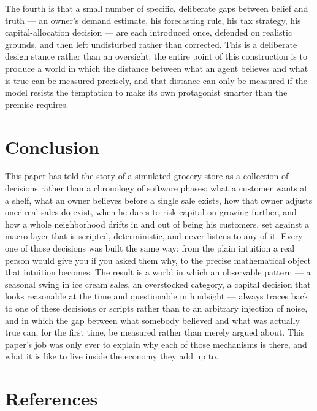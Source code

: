 \documentclass[12pt,a4paper]{article}
\begin{document}
The fourth is that a small number of specific, deliberate gaps between
belief and truth --- an owner's demand estimate, his forecasting rule,
his tax strategy, his capital-allocation decision --- are each
introduced once, defended on realistic grounds, and then left
undisturbed rather than corrected. This is a deliberate design stance
rather than an oversight: the entire point of this construction is to
produce a world in which the distance between what an agent believes
and what is true can be measured precisely, and that distance can only
be measured if the model resists the temptation to make its own
protagonist smarter than the premise requires.

\section{Conclusion}
\label{sec:conclusion}

This paper has told the story of a simulated grocery store as a
collection of decisions rather than a chronology of software phases:
what a customer wants at a shelf, what an owner believes before a
single sale exists, how that owner adjusts once real sales do exist,
when he dares to risk capital on growing further, and how a whole
neighborhood drifts in and out of being his customers, set against a
macro layer that is scripted, deterministic, and never listens to any
of it. Every one of those decisions was built the same way: from the
plain intuition a real person would give you if you asked them why, to
the precise mathematical object that intuition becomes. The result is a
world in which an observable pattern --- a seasonal swing in ice cream
sales, an overstocked category, a capital decision that looks reasonable
at the time and questionable in hindsight --- always traces back to one
of these decisions or scripts rather than to an arbitrary injection of
noise, and in which the gap between what somebody believed and what
was actually true can, for the first time, be measured rather than
merely argued about. This paper's job was only ever to explain why each
of those mechanisms is there, and what it is like to live inside the
economy they add up to.

\section*{References}
\end{document}

